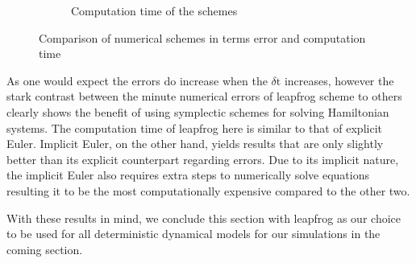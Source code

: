 \begin{figure}[H]
\begin{subfigure}{.49\textwidth}
        \caption{Computation time of the schemes}
        \label{plot:scheme_time}
    \end{subfigure}
    \caption{Comparison of numerical schemes in terms error and computation time}
    \label{plot:errors}
\end{figure}

As one would expect the errors do increase when the $\delta \text{t}$ increases, however the stark contrast between the minute numerical errors of leapfrog scheme to others clearly shows the benefit of using symplectic schemes for solving Hamiltonian systems. The computation time of leapfrog here is similar to that of explicit Euler. Implicit Euler, on the other hand, yields results that are only slightly better than its explicit counterpart regarding errors. Due to its implicit nature, the implicit Euler also requires extra steps to numerically solve equations resulting it to be the most computationally expensive compared to the other two.

With these results in mind, we conclude this section with leapfrog as our choice to be used for all deterministic dynamical models for our simulations in the coming section.


